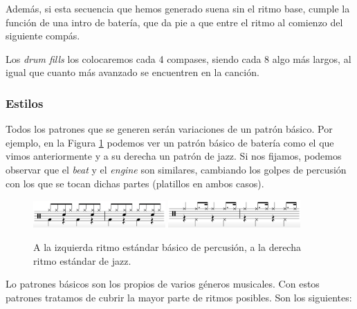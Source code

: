     Además, si esta secuencia que hemos generado suena sin el ritmo base, cumple la función de una intro de batería, que da pie a que entre el ritmo al comienzo del siguiente compás.

    Los \textit{drum fills} los colocaremos cada  4 compases, siendo cada 8 algo más largos, al igual que cuanto más avanzado se encuentren en la canción.


    
    
    \subsubsection{Estilos}
    \label{subsubsec:estilos-percusion}
    Todos los patrones que se generen serán variaciones de un patrón básico. Por ejemplo, en la Figura \ref{fig:Partituras-percusión} podemos ver un patrón básico de batería como el que vimos anteriormente y a su derecha un patrón de jazz. Si nos fijamos, podemos observar que el \textit{beat} y el \textit{engine} son similares, cambiando los golpes de percusión con los que se tocan dichas partes (platillos en ambos casos). 

    \begin{figure}[h]
        \centering
        \includegraphics[width = 0.45\textwidth]{Imagenes/Bitmap/BateriaBasico.png}
        \includegraphics[width = 0.45\textwidth]{Imagenes/Bitmap/BateriaJazz.png}
        \caption{A la izquierda ritmo estándar básico de percusión, a la derecha ritmo estándar de jazz.}
        \label{fig:Partituras-percusión}
    \end{figure}
    
    Lo patrones básicos son los propios de varios géneros musicales. Con estos patrones tratamos de cubrir la mayor parte de ritmos posibles. Son los siguientes:
    
